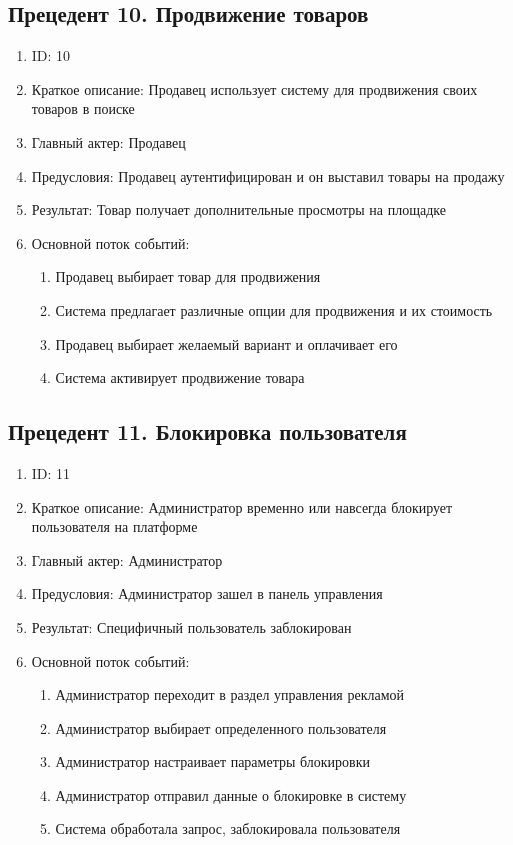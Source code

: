 \documentclass{article}
\begin{document}
\subsection{Прецедент 10. Продвижение товаров}
\begin{enumerate}
    \item ID: 10
    \item Краткое описание: Продавец использует систему для продвижения своих товаров в поиске
    \item Главный актер: Продавец
    \item Предусловия: Продавец аутентифицирован и он выставил товары на продажу
    \item Результат: Товар получает дополнительные просмотры на площадке
    \item Основной поток событий:
    \begin{enumerate}
        \item Продавец выбирает товар для продвижения
        \item Система предлагает различные опции для продвижения и их стоимость
        \item Продавец выбирает желаемый вариант и оплачивает его
        \item Система активирует продвижение товара
    \end{enumerate}
\end{enumerate}

\subsection{Прецедент 11. Блокировка пользователя}
\begin{enumerate}
    \item ID: 11
    \item Краткое описание: Администратор  временно или навсегда блокирует пользователя на платформе
    \item Главный актер: Администратор
    \item Предусловия: Администратор зашел в панель управления 
    \item Результат: Специфичный пользователь заблокирован
    \item Основной поток событий:
    \begin{enumerate}
        \item Администратор переходит в раздел управления рекламой
        \item Администратор выбирает определенного пользователя
        \item Администратор настраивает параметры блокировки
        \item Администратор отправил данные о блокировке в систему
        \item Система обработала запрос, заблокировала пользователя
    \end{enumerate}
\end{enumerate}
\end{document}
